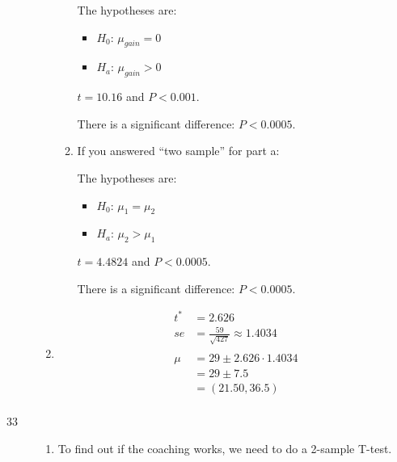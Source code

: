 \documentclass[letterpaper, landscape]{exam}
\begin{document}
\begin{description}
\begin{enumerate}[label = {(\alph*)}]
\begin{enumerate}[label = (\roman*)]
                The hypotheses are:
                \begin{itemize}[itemsep = 0pt, label = {}]
                  \item $H_0$: $\mu_{gain} = 0$
                  \item $H_a$: $\mu_{gain} > 0$
                \end{itemize}

                $t = 10.16$ and $P < 0.001$.  
                
                There is a significant difference: $P < 0.0005$.

              \item If you answered ``two sample'' for part a:

                The hypotheses are:
                \begin{itemize}[itemsep = 0pt, label = {}]
                  \item $H_0$: $\mu_{1} = \mu_{2}$
                  \item $H_a$: $\mu_{2} > \mu_{1}$
                \end{itemize}

                $t = 4.4824$ and $P < 0.0005$.  
                
                There is a significant difference: $P < 0.0005$.

            \end{enumerate}
          \item 
            \begin{align*}
              t^* & = 2.626 \\
              se  & = \frac{59}{\sqrt{427}} \approx 1.4034 \\
              \\
              \mu & = 29 \pm 2.626 \cdot 1.4034 \\
                  & = \boxed{ 29 \pm 7.5 } \\
                  & = \boxed{ (21.50, 36.5) } \\
            \end{align*}
        \end{enumerate}

      \item[33]
        \begin{enumerate}[label = {(\alph*)}]
          \item To find out if the coaching works, we need to do a 2-sample
            T-test. 
            

\end{enumerate}
\end{description}
\end{document}
